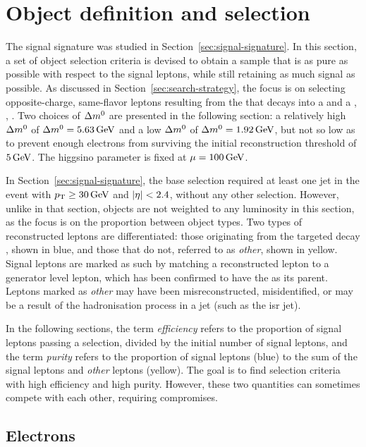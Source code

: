 \clearpage
\section{Object definition and selection}
\label{sec:object-selection}

The signal signature was studied in Section~\ref{sec:signal-signature}. In this section, a set of object selection criteria is devised to obtain a sample that is as pure as possible with respect to the signal leptons, while still retaining as much signal as possible. As discussed in Section~\ref{sec:search-strategy}, the focus is on selecting opposite-charge, same-flavor leptons \ellell resulting from the \neutt that decays into a \neuto and a \PZstar, \ie, \neuttdecay. Two choices of $\Delta m^0$ are presented in the following section: a relatively high $\Delta m^0$ of $\Delta m^0=5.63\,\text{Ge\hspace{-.08em}V}$ and a low $\Delta m^0$ of $\Delta m^0=1.92\,\text{Ge\hspace{-.08em}V}$, but not so low as to prevent enough electrons from surviving the initial reconstruction \pt threshold of $5\,\text{Ge\hspace{-.08em}V}$. The higgsino parameter is fixed at $\mu=100\,\text{Ge\hspace{-.08em}V}$.

In Section~\ref{sec:signal-signature}, the base selection required at least one jet in the event with $p_{\mathrm{T}} \geq 30\,\text{Ge\hspace{-.08em}V}$ and $\abs{\eta}<2.4$, without any other selection. However, unlike in that section, objects are not weighted to any luminosity in this section, as the focus is on the proportion between object types. Two types of reconstructed leptons are differentiated: those originating from the targeted decay \neuttdecay, shown in blue, and those that do not, referred to as \emph{other}, shown in yellow. Signal leptons are marked as such by matching a reconstructed lepton to a generator level lepton, which has been confirmed to have the \neutt as its parent. Leptons marked as \emph{other} may have been misreconstructed, misidentified, or may be a result of the hadronisation process in a jet (such as the \gls{isr} jet).

In the following sections, the term \emph{efficiency} refers to the proportion of signal leptons passing a selection, divided by the initial number of signal leptons, and the term \emph{purity} refers to the proportion of signal leptons (blue) to the sum of the signal leptons and \emph{other} leptons (yellow). The goal is to find selection criteria with high efficiency and high purity. However, these two quantities can sometimes compete with each other, requiring compromises.

\subsection{Electrons}
\label{sec:object-selection-electrons}

